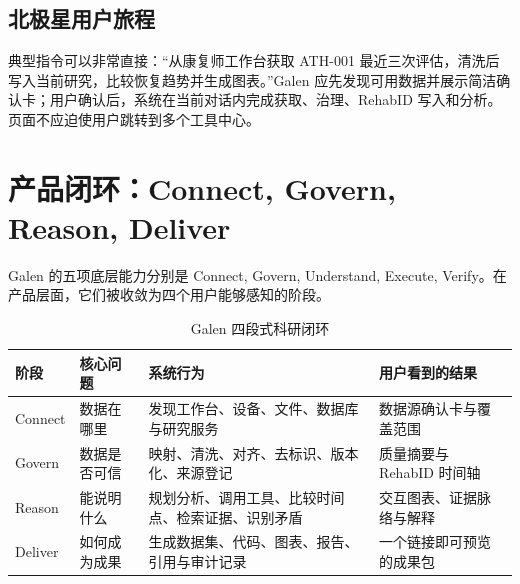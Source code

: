 \documentclass[11pt,a4paper,UTF8]{ctexart}
\newcommand{\en}[1]{\textsf{#1}}
\begin{document}
\subsection{北极星用户旅程}

\begin{center}
\end{center}

典型指令可以非常直接：“从康复师工作台获取 ATH-001 最近三次评估，清洗后写入当前研究，比较恢复趋势并生成图表。”Galen 应先发现可用数据并展示简洁确认卡；用户确认后，系统在当前对话内完成获取、治理、RehabID 写入和分析。页面不应迫使用户跳转到多个工具中心。

\section{产品闭环：Connect, Govern, Reason, Deliver}

Galen 的五项底层能力分别是 \en{Connect, Govern, Understand, Execute, Verify}。在产品层面，它们被收敛为四个用户能够感知的阶段。

\begin{table}[htbp]
\centering
\caption{Galen 四段式科研闭环}
\begin{tabularx}{\textwidth}{@{}L{2.5cm}L{3.3cm}Y L{3.1cm}@{}}
\toprule
阶段 & 核心问题 & 系统行为 & 用户看到的结果 \\
\midrule
Connect & 数据在哪里 & 发现工作台、设备、文件、数据库与研究服务 & 数据源确认卡与覆盖范围 \\
Govern & 数据是否可信 & 映射、清洗、对齐、去标识、版本化、来源登记 & 质量摘要与 RehabID 时间轴 \\
Reason & 能说明什么 & 规划分析、调用工具、比较时间点、检索证据、识别矛盾 & 交互图表、证据脉络与解释 \\
Deliver & 如何成为成果 & 生成数据集、代码、图表、报告、引用与审计记录 & 一个链接即可预览的成果包 \\
\bottomrule
\end{tabularx}
\end{table}
\end{document}
